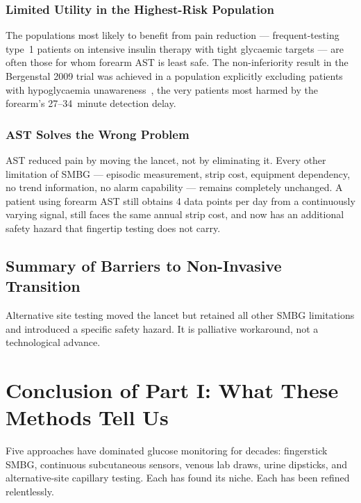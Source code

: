 \subsection*{Limited Utility in the Highest-Risk Population}

The populations most likely to benefit from pain reduction --- frequent-testing type~1 patients on intensive insulin therapy with tight glycaemic targets --- are often those for whom forearm AST is least safe. The non-inferiority result in the Bergenstal 2009 trial was achieved in a population explicitly excluding patients with hypoglycaemia unawareness~\cite{bergenstal2009}, the very patients most harmed by the forearm's 27--34~minute detection delay.

\subsection*{AST Solves the Wrong Problem}

AST reduced pain by moving the lancet, not by eliminating it. Every other limitation of SMBG --- episodic measurement, strip cost, equipment dependency, no trend information, no alarm capability --- remains completely unchanged. A patient using forearm AST still obtains 4 data points per day from a continuously varying signal, still faces the same annual strip cost, and now has an additional safety hazard that fingertip testing does not carry.

\section{Summary of Barriers to Non-Invasive Transition}

Alternative site testing moved the lancet but retained all other SMBG limitations and introduced a specific safety hazard. It is palliative workaround, not a technological advance.

\chapter*{Conclusion of Part I: What These Methods Tell Us}

Five approaches have dominated glucose monitoring for decades: fingerstick SMBG, continuous subcutaneous sensors, venous lab draws, urine dipsticks, and alternative-site capillary testing. Each has found its niche. Each has been refined relentlessly.

